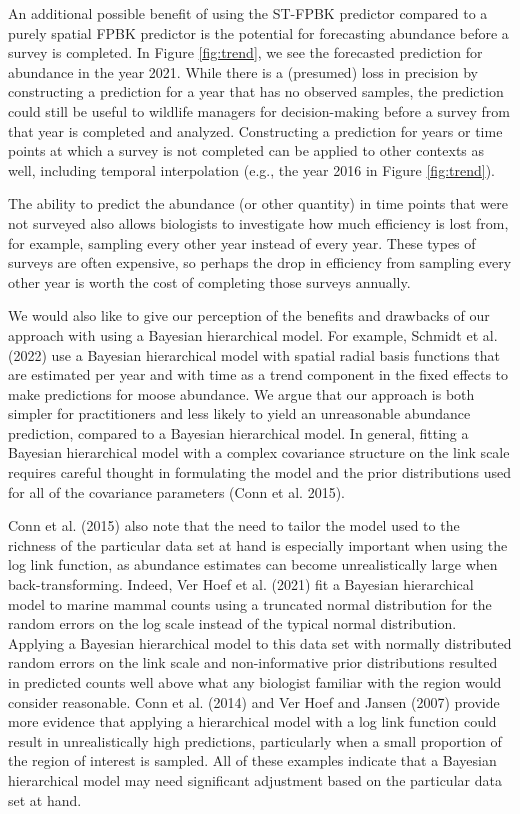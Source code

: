 \documentclass[smallextended]{svjour3}       %
\begin{document}
An additional possible benefit of using the ST-FPBK predictor compared
to a purely spatial FPBK predictor is the potential for forecasting
abundance before a survey is completed. In Figure \ref{fig:trend}, we
see the forecasted prediction for abundance in the year 2021. While
there is a (presumed) loss in precision by constructing a prediction for
a year that has no observed samples, the prediction could still be
useful to wildlife managers for decision-making before a survey from
that year is completed and analyzed. Constructing a prediction for years
or time points at which a survey is not completed can be applied to
other contexts as well, including temporal interpolation (e.g., the year
2016 in Figure \ref{fig:trend}).

The ability to predict the abundance (or other quantity) in time points
that were not surveyed also allows biologists to investigate how much
efficiency is lost from, for example, sampling every other year instead
of every year. These types of surveys are often expensive, so perhaps
the drop in efficiency from sampling every other year is worth the cost
of completing those surveys annually.

We would also like to give our perception of the benefits and drawbacks
of our approach with using a Bayesian hierarchical model. For example,
Schmidt et al. (2022) use a Bayesian hierarchical model with spatial
radial basis functions that are estimated per year and with time as a
trend component in the fixed effects to make predictions for moose
abundance. We argue that our approach is both simpler for practitioners
and less likely to yield an unreasonable abundance prediction, compared
to a Bayesian hierarchical model. In general, fitting a Bayesian
hierarchical model with a complex covariance structure on the link scale
requires careful thought in formulating the model and the prior
distributions used for all of the covariance parameters (Conn et al.
2015).

Conn et al. (2015) also note that the need to tailor the model used to
the richness of the particular data set at hand is especially important
when using the log link function, as abundance estimates can become
unrealistically large when back-transforming. Indeed, Ver Hoef et al.
(2021) fit a Bayesian hierarchical model to marine mammal counts using a
truncated normal distribution for the random errors on the log scale
instead of the typical normal distribution. Applying a Bayesian
hierarchical model to this data set with normally distributed random
errors on the link scale and non-informative prior distributions
resulted in predicted counts well above what any biologist familiar with
the region would consider reasonable. Conn et al. (2014) and Ver Hoef
and Jansen (2007) provide more evidence that applying a hierarchical
model with a log link function could result in unrealistically high
predictions, particularly when a small proportion of the region of
interest is sampled. All of these examples indicate that a Bayesian
hierarchical model may need significant adjustment based on the
particular data set at hand.
\end{document}
